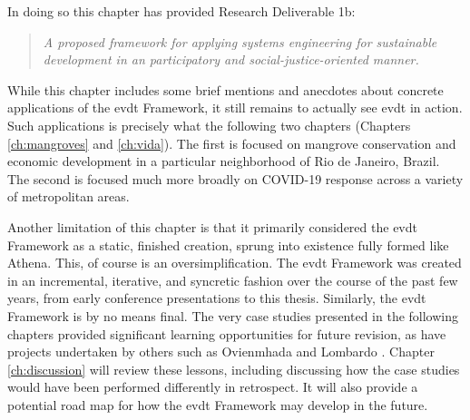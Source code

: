 In doing so this chapter has provided Research Deliverable 1b:

\blockquote{\textit{A proposed framework for applying systems engineering for sustainable development in an participatory and social-justice-oriented manner.}}

While this chapter includes some brief mentions and anecdotes about concrete applications of the \ac{evdt} Framework, it still remains to actually see \ac{evdt} in action. Such applications is precisely what the following two chapters (Chapters \ref{ch:mangroves} and \ref{ch:vida}). The first is focused on mangrove conservation and economic development in a particular neighborhood of Rio de Janeiro, Brazil. The second is focused much more broadly on COVID-19 response across a variety of metropolitan areas.

Another limitation of this chapter is that it primarily considered the \ac{evdt} Framework as a static, finished creation, sprung into existence fully formed like Athena. This, of course is an oversimplification. The \ac{evdt} Framework was created in an incremental, iterative, and syncretic fashion over the course of the past few years, from early conference presentations \cite{reidCombiningSocialEnvironmental2019} to this thesis. Similarly, the \ac{evdt} Framework is by no means final. The very case studies presented in the following chapters provided significant learning opportunities for future revision, as have projects undertaken by others such as Ovienmhada \cite{ovienmhadaEnvironmentVulnerabilityDecisionTechnologyModelingFramework2021, ovienmhadaEarthObservationTechnology2020} and Lombardo \cite{lombardoEnvironmentVulnerabilityDecisionTechnologyFrameworkDecision2022}. Chapter \ref{ch:discussion} will review these lessons, including discussing how the case studies would have been performed differently in retrospect. It will also provide a potential road map for how the \ac{evdt} Framework may develop in the future.
